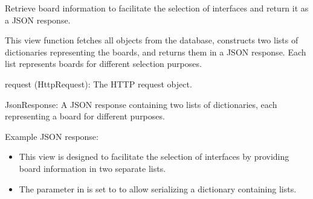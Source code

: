 \documentclass[letterpaper,10pt,english]{sphinxmanual}
\begin{document}
\begin{fulllineitems}
\label{\detokenize{app:app.views.get_infos_boards}}
\pysigstartsignatures
{}
\pysigstopsignatures
\sphinxAtStartPar
Retrieve board information to facilitate the selection of interfaces and return it as a JSON response.

\sphinxAtStartPar
This view function fetches all  objects from the database, constructs 
two lists of dictionaries representing the boards, and returns them in a JSON 
response. Each list represents boards for different selection purposes.
\begin{description}
\sphinxAtStartPar
request (HttpRequest): The HTTP request object.

\sphinxAtStartPar
JsonResponse: A JSON response containing two lists of dictionaries, each representing a board for different purposes.

\sphinxAtStartPar
Example JSON response:

\begin{sphinxVerbatim}[commandchars=\\\{\}]
\PYG{p}{[}
\PYG{p}{],}
\PYG{p}{[}
\PYG{p}{]}
\PYG{p}{]}
\end{sphinxVerbatim}

\begin{itemize}
\item {} 
\sphinxAtStartPar
This view is designed to facilitate the selection of interfaces by providing 
board information in two separate lists.

\item {} 
\sphinxAtStartPar
The  parameter in  is set to  to allow serializing a dictionary containing lists.

\end{itemize}

\end{description}

\end{fulllineitems}
\end{document}

